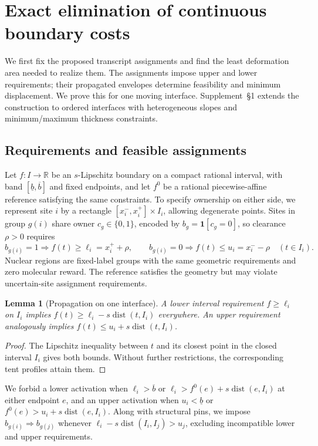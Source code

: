 \documentclass[10pt,letterpaper]{article}
\newtheorem{lemma}[theorem]{Lemma}
\newcommand{\ind}{\mathbf 1}
\newcommand{\dist}{\operatorname{dist}}
\begin{document}
\section{Exact elimination of continuous boundary costs}\label{sec:engine}
We first fix the proposed transcript assignments and find the least deformation area needed to realize them. The assignments impose upper and lower requirements; their propagated envelopes determine feasibility and minimum displacement. We prove this for one moving interface. Supplement~\S1 extends the construction to ordered interfaces with heterogeneous slopes and minimum/maximum thickness constraints.

\subsection{Requirements and feasible assignments}
Let $f:I\to\mathbb R$ be an $s$-Lipschitz boundary on a compact rational interval, with band $[\underline b,\overline b]$ and fixed endpoints, and let $f^0$ be a rational piecewise-affine reference satisfying the same constraints. To specify ownership on either side, we represent site $i$ by a rectangle $[x_i^-,x_i^+]\times I_i$, allowing degenerate points. Sites in group $g(i)$ share owner $c_g\in\{0,1\}$, encoded by $b_g=\ind[c_g=0]$, so clearance $\rho>0$ requires
\begin{equation}
 b_{g(i)}=1\Rightarrow f(t)\ge\ell_i=x_i^++\rho,\qquad
 b_{g(i)}=0\Rightarrow f(t)\le u_i=x_i^--\rho\quad(t\in I_i).\label{eq:owners}
\end{equation}
Nuclear regions are fixed-label groups with the same geometric requirements and zero molecular reward. The reference satisfies the geometry but may violate uncertain-site assignment requirements.

\begin{lemma}[Propagation on one interface]\label{lem:kernel}
A lower interval requirement $f\ge\ell_i$ on $I_i$ implies
$f(t)\ge\ell_i-s\dist(t,I_i)$ everywhere. An upper requirement analogously implies $f(t)\le u_i+s\dist(t,I_i)$.
\end{lemma}
\begin{proof}
The Lipschitz inequality between $t$ and its closest point in the closed interval $I_i$ gives both bounds. Without further restrictions, the corresponding tent profiles attain them.
\end{proof}

We forbid a lower activation when $\ell_i>\overline b$ or $\ell_i>f^0(e)+s\dist(e,I_i)$ at either endpoint $e$, and an upper activation when $u_i<\underline b$ or $f^0(e)>u_i+s\dist(e,I_i)$. Along with structural pins, we impose $b_{g(i)}\Rightarrow b_{g(j)}$ whenever $\ell_i-s\dist(I_i,I_j)>u_j$, excluding incompatible lower and upper requirements.
\end{document}
